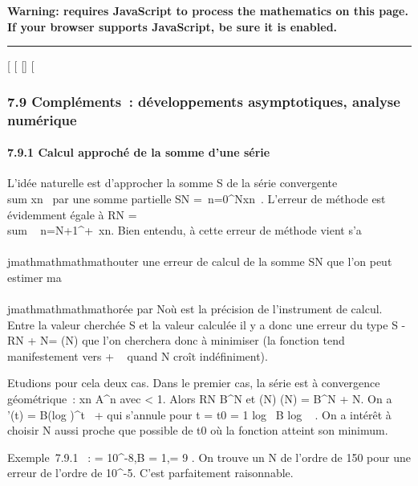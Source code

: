 \textbf{Warning: 
requires JavaScript to process the mathematics on this page.\\ If your
browser supports JavaScript, be sure it is enabled.}

\begin{center}\rule{3in}{0.4pt}\end{center}

{[}
{[}
{[}{]}
{[}

\subsubsection{7.9 Compléments~: développements asymptotiques, analyse
numérique}

\paragraph{7.9.1 Calcul approché de la somme d'une série}

L'idée naturelle est d'approcher la somme S de la série convergente
\\sum  xn~ par
une somme partielle SN =\
\sum  n=0^Nxn~.
L'erreur de méthode est évidemment égale à RN
= \\sum ~
n=N+1^+\infty~xn. Bien entendu, à cette erreur de
méthode vient s'a\\\\jmathmathmathmathouter une erreur de calcul de la somme SN
que l'on peut estimer ma\\\\jmathmathmathmathorée par N\epsilon où \epsilon est la précision de
l'instrument de calcul. Entre la valeur cherchée S et la valeur calculée
\overlineSN il y a donc une erreur du type
\textbar{}S
-\overlineSN\textbar{}\leq\textbar{}RN\textbar{}
+ N\epsilon = \delta(N) que l'on cherchera donc à minimiser (la fonction \delta tend
manifestement vers + \infty~ quand N croît indéfiniment).

Etudions pour cela deux cas. Dans le premier cas, la série est à
convergence géométrique~: \textbar{}xn\textbar{}\leq
A\rho^n avec \rho \textless{} 1. Alors RN \leq
B\rho^N et \delta(N) \leq {}(N) = B\rho^N + N\epsilon. On a
\delta1'(t) = B(log \rho)\rho^t~ + \epsilon
qui s'annule pour t = t0 = 1 \over \rho
 log~ \left \textbar{} \epsilon
\over B log \rho~
\right \textbar{}. On a intérêt à choisir N aussi proche
que possible de t0 où la fonction  atteint son
minimum.

Exemple~7.9.1 ~: \epsilon = 10^-8,B = 1,\rho = 9  . On trouve un N de l'ordre de 150 pour une erreur de l'ordre de
10^-5. C'est parfaitement raisonnable.

